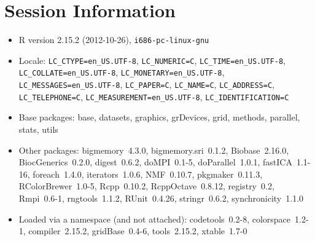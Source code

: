 \documentclass[10pt]{article}
\begin{document}
\section*{Session Information}
\begin{itemize}\raggedright
  \item R version 2.15.2 (2012-10-26), \verb|i686-pc-linux-gnu|
  \item Locale: \verb|LC_CTYPE=en_US.UTF-8|, \verb|LC_NUMERIC=C|, \verb|LC_TIME=en_US.UTF-8|, \verb|LC_COLLATE=en_US.UTF-8|, \verb|LC_MONETARY=en_US.UTF-8|, \verb|LC_MESSAGES=en_US.UTF-8|, \verb|LC_PAPER=C|, \verb|LC_NAME=C|, \verb|LC_ADDRESS=C|, \verb|LC_TELEPHONE=C|, \verb|LC_MEASUREMENT=en_US.UTF-8|, \verb|LC_IDENTIFICATION=C|
  \item Base packages: base, datasets, graphics, grDevices, grid,
    methods, parallel, stats, utils
  \item Other packages: bigmemory~4.3.0, bigmemory.sri~0.1.2,
    Biobase~2.16.0, BiocGenerics~0.2.0, digest~0.6.2, doMPI~0.1-5,
    doParallel~1.0.1, fastICA~1.1-16, foreach~1.4.0, iterators~1.0.6,
    NMF~0.10.7, pkgmaker~0.11.3, RColorBrewer~1.0-5, Rcpp~0.10.2,
    RcppOctave~0.8.12, registry~0.2, Rmpi~0.6-1, rngtools~1.1.2,
    RUnit~0.4.26, stringr~0.6.2, synchronicity~1.1.0
  \item Loaded via a namespace (and not attached): codetools~0.2-8,
    colorspace~1.2-1, compiler~2.15.2, gridBase~0.4-6, tools~2.15.2,
    xtable~1.7-0
\end{itemize}
\end{document}
